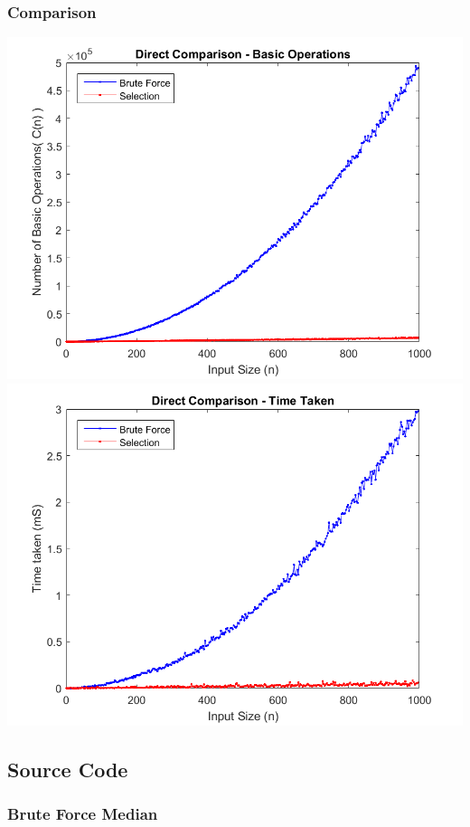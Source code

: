 \documentclass{article}
\begin{document}
        \subsubsection{Comparison}
            \includegraphics[scale=0.6]{Images/direct_comparison_basic_operations.png}\\
            \includegraphics[scale=0.6]{Images/direct_comparison_time_taken.png}
    \newpage
    \subsection{Source Code}
        \subsubsection{Brute Force Median}
            
\end{document}
